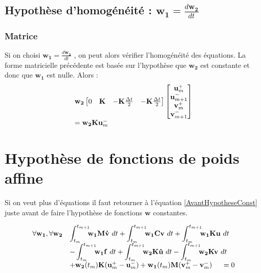 \documentclass[12pt,a4paper]{report}
\begin{document}
\subsection{Hypothèse d'homogénéité : $\displaystyle \mathbf{w_1} = \frac{d\mathbf{w_2}}{dt}$}

\subsubsection{Matrice}
Si on choisi $\displaystyle \mathbf{w_1} = \frac{d\mathbf{w_2}}{dt}$ , on peut alors vérifier l'homogénéité des équations. La forme matricielle précédente est basée sur l'hypothèse que $ \mathbf{w_2} $ est constante et donc que $ \mathbf{w_1} $ est nulle. Alors :
\begin{equation}
\begin{array}{l l}
		\mathbf{w_2}
		\begin{bmatrix}	   
		   0 
		   &\mathbf{K} 
		   &-\mathbf{K}\frac{\Delta t}{2} 
		   &-\mathbf{K}\frac{\Delta t}{2} \\ 
		\end{bmatrix}
		\begin{bmatrix}
		   \mathbf{u}_m^+  		\\
		   \mathbf{u}_{m+1}^-  	\\
		   \mathbf{v}_m^+  		\\
		   \mathbf{v}_{m+1}^-  	\\
		\end{bmatrix}
	\\
		=  \mathbf{w_2} \mathbf{K} \mathbf{u}_m^- 
	
\end{array}
\end{equation}

\section{Hypothèse de fonctions de poids affine}

Si on veut plus d'équations il faut retourner à l'équation \ref{AvantHypotheseConst} juste avant de faire l'hypothèse de fonctions $\mathbf{w}$ constantes.

\begin{equation}
\begin{array}{r l}
	\forall \mathbf{w_1},\forall \mathbf{w_2}
	&\displaystyle
	 \int_{t_m}^{t_{m+1}} \!\!\! 	\mathbf{w_1}
		\mathbf{M}\mathbf{\dot{v}} ~dt
	 +\int_{t_m}^{t_{m+1}} \!\!\! 	\mathbf{w_1}
		\mathbf{C}\mathbf{v} ~dt
	 +\int_{t_m}^{t_{m+1}} \!\!\! 	\mathbf{w_1}
		\mathbf{K}\mathbf{u} ~dt
	\\
	  &\displaystyle
	   - \int_{t_m}^{t_{m+1}} \!\!\! 	\mathbf{w_1}
			\mathbf{f} ~dt		
	   + \int_{t_m}^{t_{m+1}} \!\!\! 
	    	\mathbf{w_2} \mathbf{K}\mathbf{\dot{u}}~dt 
	    -\int_{t_m}^{t_{m+1}} \!\!\! 
	    	\mathbf{w_2} \mathbf{K}     \mathbf{v} ~dt
	\\
	  &+ \mathbf{w_2}(t_m) \mathbf{K} (\mathbf{u}_m^+ - \mathbf{u}_m^-)
	   +  \mathbf{w_1}(t_m) \mathbf{M}(\mathbf{v}_m^+ - \mathbf{v}_m^-)
	~~~~=0
\end{array}
\end{equation}
\end{document}
